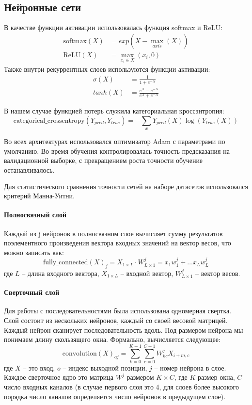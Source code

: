\subsection{Нейронные сети}

В качестве функции активации использовалась функция softmax и ReLU:
\begin{align} \label{eq:softmax}
\text{softmax}(X) &= exp(X - \max_{axis}(X)) \\
\text{ReLU}(X) &= \max_{x_i \in X}(x_i, 0)
\end{align}
Также внутри рекуррентных слоев используются функции активации:
\begin{align}
	\sigma(X) &= \frac{1}{1+ e^{-X}}  \\
	tanh(X) &= \frac{e^{X} - e^{-X}}{e^{X} + e^{-X}}
\end{align}

В нашем случае функцией потерь служила категориальная кроссэнтропия:
\begin{equation} \label{eq:cross}
\text{categorical\_crossentropy}(Y_{pred}, Y_{true}) = -\sum_{x}{Y_{pred}(X)\log(Y_{true}(X))}
\end{equation}

Во всех архитектурах использовался оптимизатор  Adam \cite{kingma_adam:_2014} с параметрами по умолчанию. 
Во время обучения контролировалась точность предсказания на валидационной выборке, с прекращением роста точности обучение останавливалось.

Для статистического сравнения точности сетей на наборе датасетов использовался критерий Манна-Уитни.

\paragraph{Полносвязный слой}
Каждый из j нейронов в полносвязном слое вычисляет сумму результатов поэлементного произведения вектора входных значений на вектор весов, что можно записать как:
\begin{equation}
	\text{fully_connected}(X)_{j} = X_{1\times L} \cdot W^j_{L\times 1} = x_1 w^j_1 +  \dots x_L w^j_L 
\end{equation}
где $L$ -- длина входного вектора, $X_{1\times L}$ -- входной вектор, $W^j_{L\times 1}$ -- вектор весов.

\paragraph{Сверточный слой}

Для работы с последовательностями была использована одномерная свертка. Слой состоит из нескольких нейронов, каждый со своей весовой матрицей. Каждый нейрон сканирует последовательность вдоль. Под размером нейрона мы понимаем длину скользящего окна. Формально, вычисляется следующее:
\begin{equation}
	\text{convolution}(X)_{oj} = \sum_{k=0}^{K-1}\sum_{c=0}^{C-1} W_{kc}^j X_{i+m, c}
\end{equation}
где $X$ -- это вход, $o$ -- индекс выходной позиции, $j$ -- номер нейрона в слое. Каждое сверточное ядро это матрица $W^j$ размером $K \times C$, где $K$ размер окна, $C$ число входных каналов (в случае первого слоя это 4, для слоев более высокого порядка число каналов определяется число нейронов в предыдущем слое).
